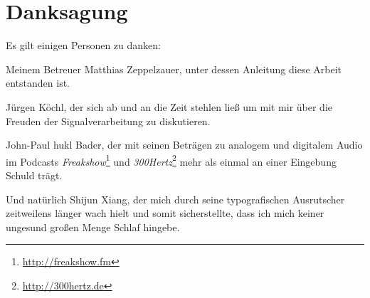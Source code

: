 \chapter*{Danksagung}

\noindent Es gilt einigen Personen zu danken:

\vspace{6mm}

\noindent Meinem Betreuer Matthias Zeppelzauer, unter dessen Anleitung diese Arbeit entstanden ist.

\vspace{6mm}

\noindent J\"urgen K\"ochl, der sich ab und an die Zeit stehlen lie{\ss} um mit mir über die Freuden der Signalverarbeitung zu diskutieren.

\vspace{6mm}

\noindent John-Paul \glqq hukl\grqq{} Bader, der mit seinen Betr\"agen zu analogem und digitalem Audio im Podcasts \emph{Freakshow}\footnote{\url{http://freakshow.fm}} und \textit{300Hertz}\footnote{\url{http://300hertz.de}} mehr als einmal an einer Eingebung Schuld tr\"agt. 

\vspace{6mm}

\noindent Und natürlich Shijun Xiang, der mich durch seine typografischen Ausrutscher zeitweilens l\"anger wach hielt und somit sicherstellte, dass ich mich keiner ungesund gro{\ss}en Menge Schlaf hingebe. 
